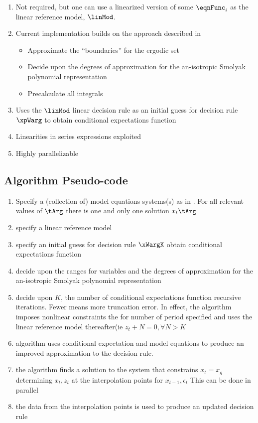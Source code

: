 \documentclass[12pt]{article}
\begin{document}
  


\begin{enumerate}
\item Not required, but one can use a linearized version of some $\eqnFunc_i$  as the  linear reference model, $\linMod$.
\item Current implementation builds on the approach described in \cite{Judd2014}
  \begin{itemize}
  \item Approximate the ``boundaries'' for the ergodic set
  \item Decide upon the  degrees of approximation for the an-isotropic Smolyak polynomial representation
  \item Precalculate all integrals
  \end{itemize}
\item Uses the $\linMod$ linear decision rule as an initial guess for decision rule $\xpWarg$ to obtain conditional expectations function
\item Linearities in series expressions exploited
\item Highly parallelizable 
\end{enumerate}








\subsection{Algorithm Pseudo-code}
\label{sec:pseudocode}

\begin{enumerate}
\item Specify a (collection of) model equations systems(s) 
as in .
For all relevant values of $\tArg$ there is one and only one solution $x_t\tArg$
\item specify a linear reference model
\item specify an initial guess for decision rule $\xWargK$ obtain conditional expectations function
\item decide upon the ranges for variables and the degrees of approximation for the an-isotropic Smolyak polynomial representation
\item decide upon $K$, the number of conditional expectations function recursive iterations.  Fewer means more truncation error. In effect, 
the algorithm imposes nonlinear constraints the for number of period specified 
and uses the linear reference model thereafter(ie $z_t+N=0, \forall N>K$
\item algorithm uses conditional expectation and model equations to produce an improved approximation to the decision rule.
\item the algorithm finds a solution to the system that constrains $x_t= x_g$ determining $x_t,z_t$ at the interpolation points for $x_{t-1},\epsilon_t$  This can be done in parallel
\item the data from the interpolation points is used to produce an updated decision rule
\end{enumerate}
\end{document}
